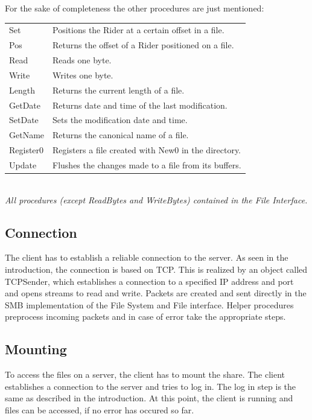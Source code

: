 \documentclass[11pt,a4paper]{book}
\begin{document}
For the sake of completeness the other procedures are just mentioned:

\begin{center}
\begin{tabular}{l|l}
Set & Positions the Rider at a certain offset in a file. \\
Pos & Returns the offset of a Rider positioned on a file. \\
Read & Reads one byte. \\
Write & Writes one byte. \\
Length & Returns the current length of a file. \\
GetDate & Returns date and time of the last modification. \\
SetDate & Sets the modification date and time. \\
GetName & Returns the canonical name of a file. \\
Register0 & Registers a file created with New0 in the directory. \\
Update & Flushes the changes made to a file from its buffers. \\
\end{tabular} \\
\vspace{6pt}
\textit{All procedures (except ReadBytes and WriteBytes) contained in the File Interface.}
\end{center}

\subsection{Connection}
The client has to establish a reliable connection to the server. As seen in the introduction, the connection is based on TCP. This is realized by an object called TCPSender, which establishes a connection to a specified IP address and port and opens streams to read and write. Packets are created and sent directly in the SMB implementation of the File System and File interface. Helper procedures preprocess incoming packets and in case of error take the appropriate steps.

\subsection{Mounting}
To access the files on a server, the client has to mount the share. The client establishes a connection to the server and tries to log in. The log in step is the same as described in the introduction. At this point, the client is running and files can be accessed, if no error has occured so far.
\end{document}
